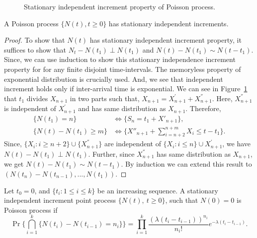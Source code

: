 \documentclass[a4paper,10pt,english]{article}
\begin{document}
\begin{figure}[hhhh]
\center
	
  \caption{Stationary independent increment property of Poisson process.}
	\label{Fig:IndependentIncrements}
\end{figure}
\begin{prop} A Poisson process $\{N(t), t\geqslant 0\}$ has stationary independent increments.
\end{prop}
\begin{proof}
To show that $N(t)$ has stationary independent increment property, it suffices to show that $N_t-N(t_{1}) \perp N(t_1)$ and $N(t) - N(t_1) \sim N(t-t_1)$. Since, we can use induction to show this stationary independence increment property for for any finite disjoint time-intervals. The memoryless property of exponential distribution is crucially used. And, we see that independent increment holds only if inter-arrival time is exponential. We can see in Figure~\ref{Fig:IndependentIncrements} that $t_1$ divides $X_{n+1}$ in two parts such that, $X_{n+1} = X_{n+1}^{'} + X_{n+1}^{''}$. Here,  $X_{n+1}^{''}$ is independent of $X_{n+1}^{'}$ and has same distribution as $X_{n+1}$. Therefore, 
\begin{align*}
\{ N(t_1) = n \} &\iff  \{ S_n = t_1 + X'_{n+1} \}, \\
\{ N(t) - N(t_1) \geqslant m \} &\iff \{ X''_{n+1} + \sum_{i=n+2}^{n+m} X_i \leqslant t - t_1 \}.
\end{align*}
Since, $\{X_i: i \geqslant n+2\}\cup\{X_{n+1}^{''}\}$ are independent of $\{X_i: i \leqslant n\}\cup{X_{n+1}^{'}}$, we have $N(t)-N(t_{1}) \perp N(t_1)$. Further, since $X_{n+1}^{''}$ has same distribution as $X_{n+1}$, we get $N(t) - N(t_1) \sim N(t-t_1)$. By induction we can extend this result to $(N(t_{n})-N(t_{n-1}),...,N(t_{1}))$. 
\end{proof}

\begin{prop} Let $t_0 = 0$, and $\{t_i: 1 \leq i \leq k\}$ be an increasing sequence. A stationary independent increment point process $\{N(t),~t\geqslant 0\}$, such that $N(0) = 0$ is Poisson process if 
\begin{equation*}
  \Pr\{\bigcap_{i=1}^k \{N(t_i)-N(t_{i-1})= n_{i}\}\} = \prod_{i=1}^{k}\frac{(\lambda(t_{i}-t_{i-1}))^{n_{i}}}{n_{i}!} e^{-\lambda (t_{i}-t_{i-1})}.
\end{equation*}
\end{prop}
\end{document}
